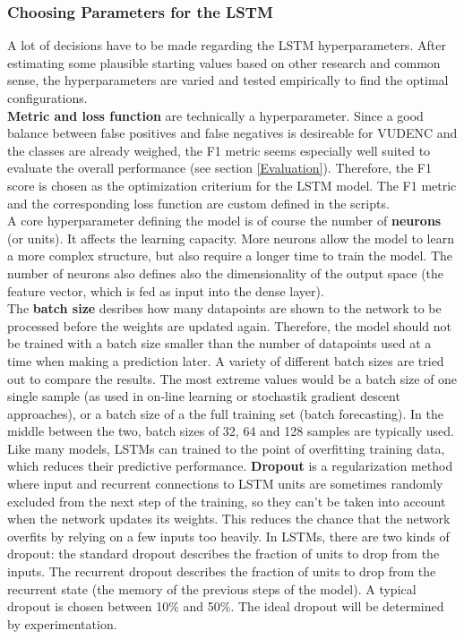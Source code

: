 \documentclass[
	a4paper,
	pagesize,
	pdftex,
	12pt,
	twoside, %
	BCOR=5mm, %
	ngerman,
	fleqn,
	final,
	]{scrartcl}
\begin{document}
\subsubsection{Choosing Parameters for the LSTM}
A lot of decisions have to be made regarding the LSTM hyperparameters. After estimating some plausible starting values based on other research and common sense, the hyperparameters are varied and tested empirically to find the optimal configurations.\\
\textbf{Metric and loss function} are technically a hyperparameter. Since a good balance between false positives and false negatives is desireable for VUDENC and the classes are already weighed, the F1 metric seems especially well suited to evaluate the overall performance (see section \ref{Evaluation}). Therefore, the F1 score is chosen as the optimization criterium for the LSTM model. The F1 metric and the corresponding loss function are custom defined in the scripts.\\
A core hyperparameter defining the model is of course the number of \textbf{neurons} (or units). It affects the learning capacity. More neurons allow the model to learn a more complex structure, but also require a longer time to train the model. The number of neurons also defines also the dimensionality of the output space (the feature vector, which is fed as input into the dense layer).\\  
The \textbf{batch size} desribes how many datapoints are shown to the network to be processed before the weights are updated again. Therefore, the model should not be trained with a batch size smaller than the number of datapoints used at a time when making a prediction later. A variety of different batch sizes are tried out to compare the results. The most extreme values would be a batch size of one single sample (as used in on-line learning or stochastik gradient descent approaches), or a batch size of a the full training set (batch forecasting). In the middle between the two, batch sizes of 32, 64 and 128 samples are typically used.\\
Like many models, LSTMs can trained to the point of overfitting training data, which reduces their predictive performance. \textbf{Dropout} is a regularization method where input and recurrent connections to LSTM units are sometimes randomly excluded from the next step of the training, so they can't be taken into account when the network updates its weights. This reduces the chance that the network overfits by relying on a few inputs too heavily. In LSTMs, there are two kinds of dropout: the standard dropout describes the fraction of units to drop from the inputs. The recurrent dropout describes the fraction of units to drop from the recurrent state (the memory of the previous steps of the model). A typical dropout is chosen between 10\% and 50\%. The ideal dropout will be determined by experimentation.\\
\end{document}
